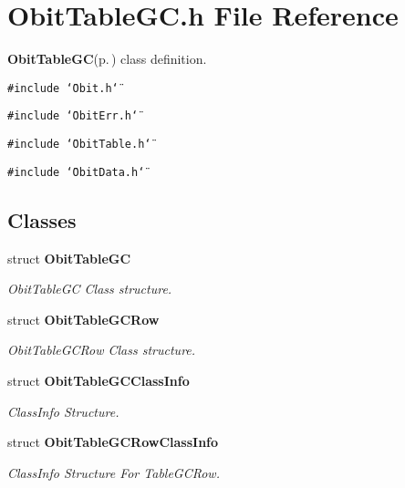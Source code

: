 \section{Obit\-Table\-GC.h File Reference}
\label{ObitTableGC_8h}
{\bf Obit\-Table\-GC}{\rm (p.\,\pageref{structObitTableGC})} class definition. 

{\tt \#include \char`\"{}Obit.h\char`\"{}}\par
{\tt \#include \char`\"{}Obit\-Err.h\char`\"{}}\par
{\tt \#include \char`\"{}Obit\-Table.h\char`\"{}}\par
{\tt \#include \char`\"{}Obit\-Data.h\char`\"{}}\par
\subsection*{Classes}
\begin{CompactItemize}
\item 
struct {\bf Obit\-Table\-GC}
\begin{CompactList}\small\item\em Obit\-Table\-GC Class structure. \item\end{CompactList}\item 
struct {\bf Obit\-Table\-GCRow}
\begin{CompactList}\small\item\em Obit\-Table\-GCRow Class structure. \item\end{CompactList}\item 
struct {\bf Obit\-Table\-GCClass\-Info}
\begin{CompactList}\small\item\em Class\-Info Structure. \item\end{CompactList}\item 
struct {\bf Obit\-Table\-GCRow\-Class\-Info}
\begin{CompactList}\small\item\em Class\-Info Structure For Table\-GCRow. \item\end{CompactList}\end{CompactItemize}
